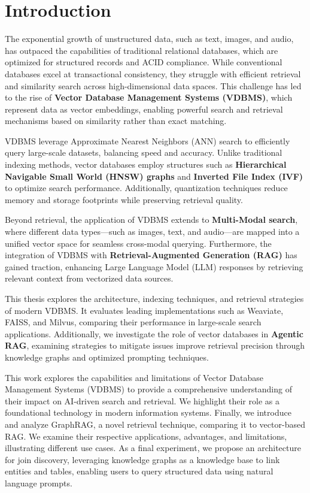 \pagestyle{fancy}
\chapter*{Introduction}
\pagestyle{fancy}
The exponential growth of unstructured data, such as text, images, and audio, has outpaced the capabilities of traditional relational databases, which are optimized for structured records and ACID compliance. While conventional databases excel at transactional consistency, they struggle with efficient retrieval and similarity search across high-dimensional data spaces. This challenge has led to the rise of \textbf{Vector Database Management Systems (VDBMS)}, which represent data as vector embeddings, enabling powerful search and retrieval mechanisms based on similarity rather than exact matching.  

VDBMS leverage Approximate Nearest Neighbors (ANN) search to efficiently query large-scale datasets, balancing speed and accuracy. Unlike traditional indexing methods, vector databases employ structures such as \textbf{Hierarchical Navigable Small World (HNSW) graphs} and \textbf{Inverted File Index (IVF)} to optimize search performance. Additionally, quantization techniques reduce memory and storage footprints while preserving retrieval quality.  

Beyond retrieval, the application of VDBMS extends to \textbf{Multi-Modal search}, where different data types—such as images, text, and audio—are mapped into a unified vector space for seamless cross-modal querying. Furthermore, the integration of VDBMS with \textbf{Retrieval-Augmented Generation (RAG)} has gained traction, enhancing Large Language Model (LLM) responses by retrieving relevant context from vectorized data sources.  

This thesis explores the architecture, indexing techniques, and retrieval strategies of modern VDBMS. It evaluates leading implementations such as Weaviate, FAISS, and Milvus, comparing their performance in large-scale search applications. Additionally, we investigate the role of vector databases in \textbf{Agentic RAG}, examining strategies to mitigate issues improve retrieval precision through knowledge graphs and optimized prompting techniques.  

This work explores the capabilities and limitations of Vector Database Management Systems (VDBMS) to provide a comprehensive understanding of their impact on AI-driven search and retrieval. We highlight their role as a foundational technology in modern information systems. Finally, we introduce and analyze GraphRAG, a novel retrieval technique, comparing it to vector-based RAG. We examine their respective applications, advantages, and limitations, illustrating different use cases. As a final experiment, we propose an architecture for join discovery, leveraging knowledge graphs as a knowledge base to link entities and tables, enabling users to query structured data using natural language prompts.

